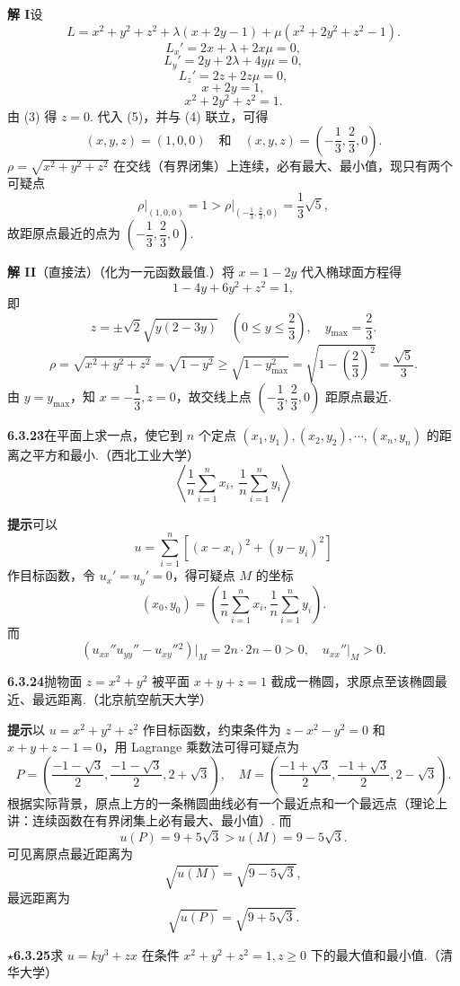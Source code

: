 \documentclass[UTF8,12pt,a4paper,fontset=fandol]{ctexart}
\begin{document}
\noindent\textbf{解 I}\quad 设
\[
  L=x^2+y^2+z^2+\lambda(x+2y-1)+\mu(x^2+2y^2+z^2-1).
\]
\[
  L_x'=2x+\lambda+2x\mu=0, \tag{1}
\]
\[
  L_y'=2y+2\lambda+4y\mu=0, \tag{2}
\]
\[
  L_z'=2z+2z\mu=0, \tag{3}
\]
\[
  x+2y=1, \tag{4}
\]
\[
  x^2+2y^2+z^2=1. \tag{5}
\]
由 (3) 得 $z=0$. 代入 (5)，并与 (4) 联立，可得
\[
  (x,y,z)=(1,0,0)\quad\text{和}\quad
  (x,y,z)=\left(-\frac13,\frac23,0\right).
\]
$\rho=\sqrt{x^2+y^2+z^2}$ 在交线（有界闭集）上连续，必有最大、最小值，现只有两个可疑点
\[
  \rho\big|_{(1,0,0)}=1>\rho\bigg|_{\left(-\frac13,\frac23,0\right)}
  =\frac13\sqrt5,
\]
故距原点最近的点为 $\left(-\dfrac13,\dfrac23,0\right)$.

\noindent\textbf{解 II}\quad （直接法）（化为一元函数最值.）将 $x=1-2y$ 代入椭球面方程得
\[
  1-4y+6y^2+z^2=1,
\]
即
\[
  z=\pm\sqrt2\sqrt{y(2-3y)}\quad
  \left(0\le y\le\frac23\right),\quad y_{\max}=\frac23.
\]
\[
  \rho=\sqrt{x^2+y^2+z^2}
  =\sqrt{1-y^2}\ge\sqrt{1-y_{\max}^2}
  =\sqrt{1-\left(\frac23\right)^2}=\frac{\sqrt5}{3}.
\]
由 $y=y_{\max}$，知 $x=-\dfrac13,z=0$，故交线上点 $\left(-\dfrac13,\dfrac23,0\right)$ 距原点最近.

\noindent\textbf{6.3.23}\quad 在平面上求一点，使它到 $n$ 个定点 $(x_1,y_1),(x_2,y_2),\cdots,(x_n,y_n)$ 的距离之平方和最小.（西北工业大学）
\[
  \left\langle
  \frac1n\sum_{i=1}^n x_i,\ \frac1n\sum_{i=1}^n y_i
  \right\rangle
\]

\noindent\textbf{提示}\quad 可以
\[
  u=\sum_{i=1}^n[(x-x_i)^2+(y-y_i)^2]
\]
作目标函数，令 $u_x'=u_y'=0$，得可疑点 $M$ 的坐标
\[
  (x_0,y_0)=\left(\frac1n\sum_{i=1}^n x_i,\frac1n\sum_{i=1}^n y_i\right).
\]
而
\[
  (u_{xx}''u_{yy}''-u_{xy}''{}^2)\big|_M=2n\cdot2n-0>0,\quad
  u_{xx}''\big|_M>0.
\]

\noindent\textbf{6.3.24}\quad 抛物面 $z=x^2+y^2$ 被平面 $x+y+z=1$ 截成一椭圆，求原点至该椭圆最近、最远距离.（北京航空航天大学）

\noindent\textbf{提示}\quad 以 $u=x^2+y^2+z^2$ 作目标函数，约束条件为 $z-x^2-y^2=0$ 和 $x+y+z-1=0$，用 Lagrange 乘数法可得可疑点为
\[
  P=\left(\frac{-1-\sqrt3}{2},\frac{-1-\sqrt3}{2},2+\sqrt3\right),
  \quad
  M=\left(\frac{-1+\sqrt3}{2},\frac{-1+\sqrt3}{2},2-\sqrt3\right).
\]
根据实际背景，原点上方的一条椭圆曲线必有一个最近点和一个最远点（理论上讲：连续函数在有界闭集上必有最大、最小值）. 而
\[
  u(P)=9+5\sqrt3>u(M)=9-5\sqrt3.
\]
可见离原点最近距离为
\[
  \sqrt{u(M)}=\sqrt{9-5\sqrt3},
\]
最远距离为
\[
  \sqrt{u(P)}=\sqrt{9+5\sqrt3}.
\]

\noindent\textbf{\ensuremath{\star}6.3.25}\quad 求 $u=ky^3+zx$ 在条件 $x^2+y^2+z^2=1,z\ge0$ 下的最大值和最小值.（清华大学）
\end{document}
